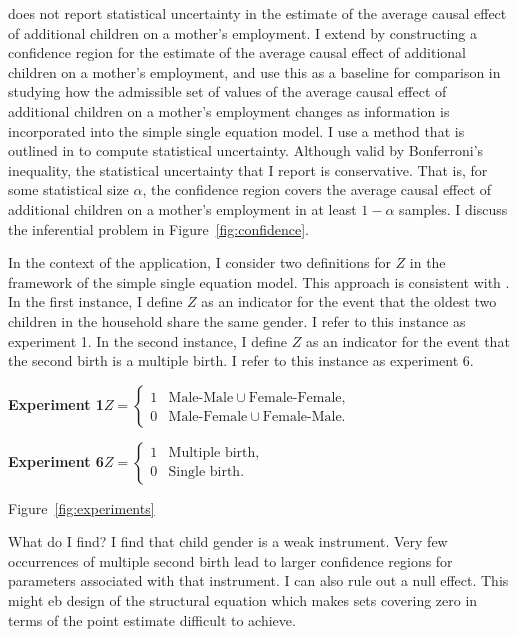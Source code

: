 \documentclass[10pt,a4paper,twoside]{article}
\numberwithin{equation}{section}
\begin{document}
\cite{cr13} does not report statistical uncertainty in the estimate of the average causal effect of additional children on a mother's employment. I extend \cite{cr13} by constructing a confidence region for the estimate of the average causal effect of additional children on a mother's employment, and use this as a baseline for comparison in studying how the admissible set of values of the average causal effect of additional children on a mother's employment changes as information is incorporated into the simple single equation model. I use a method that is outlined in \cite{cHlr13} to compute statistical uncertainty. Although valid by Bonferroni's inequality, the statistical uncertainty that I report is conservative. That is, for some statistical size $\alpha$, the confidence region covers the average causal effect of additional children on a mother's employment in at least $1-\alpha$ samples. I discuss the inferential problem in Figure~\ref{fig:confidence}.

In the context of the application, I consider two definitions for $Z$ in the framework of the simple single equation model. This approach is consistent with \cite{cr13}. In the first instance, I define $Z$ as an indicator for the event that the oldest two children in the household share the same gender. I refer to this instance as experiment 1. In the second instance, I define $Z$ as an indicator for the event that the second birth is a multiple birth. I refer to this instance as experiment 6.
 
\noindent\textbf{Experiment 1}\hspace{10pt}$Z=\begin{cases}
1 &\text{Male-Male}\cup\text{Female-Female},\\
0 &\text{Male-Female}\cup\text{Female-Male}.
\end{cases}$

\noindent\textbf{Experiment 6}\hspace{10pt}$Z=\begin{cases}
1 &\text{Multiple birth},\\
0 &\text{Single birth}.
\end{cases}$

\noindent Figure~\ref{fig:experiments}

\noindent\color{red}What do I find? I find that child gender is a weak instrument. Very few occurrences of multiple second birth lead to larger confidence regions for parameters associated with that instrument. I can also rule out a null effect. This might eb design of the structural equation which makes sets covering zero in terms of the point estimate difficult to achieve.\color{black} 
\end{document}

